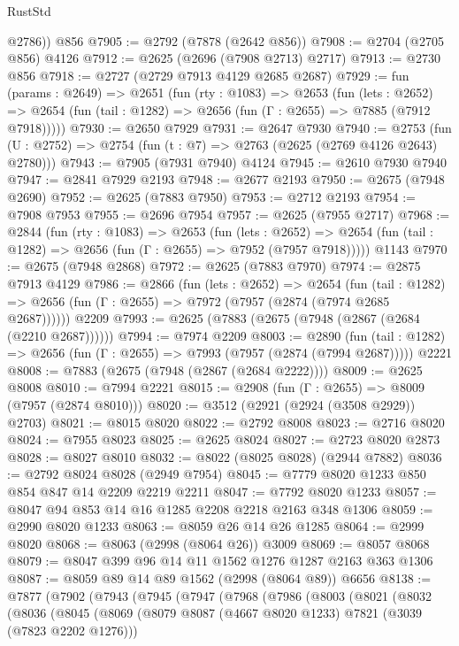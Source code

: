 \begin{lexlean}{RustStd}
\begin{coremodule}
        @2786))
    @856
@7905 := @2792 (@7878 (@2642 @856))
@7908 := @2704 (@2705 @856) @4126
@7912 := @2625 (@2696 (@7908 @2713) @2717)
@7913 := @2730 @856
@7918 := @2727 (@2729 @7913 @4129 @2685 @2687)
@7929 := fun (params : @2649) =>
  @2651
    (fun (rty : @1083) =>
    @2653
      (fun (lets : @2652) =>
      @2654 (fun (tail : @1282) => @2656 (fun (Γ : @2655) => @7885 (@7912 @7918)))))
@7930 := @2650 @7929
@7931 := @2647 @7930
@7940 := @2753 (fun (U : @2752) => @2754 (fun (t : @7) => @2763 (@2625 (@2769 @4126 @2643) @2780)))
@7943 := @7905 (@7931 @7940) @4124
@7945 := @2610 @7930 @7940
@7947 := @2841 @7929 @2193
@7948 := @2677 @2193
@7950 := @2675 (@7948 @2690)
@7952 := @2625 (@7883 @7950)
@7953 := @2712 @2193
@7954 := @7908 @7953
@7955 := @2696 @7954
@7957 := @2625 (@7955 @2717)
@7968 := @2844
    (fun (rty : @1083) =>
    @2653
      (fun (lets : @2652) =>
      @2654 (fun (tail : @1282) => @2656 (fun (Γ : @2655) => @7952 (@7957 @7918)))))
    @1143
@7970 := @2675 (@7948 @2868)
@7972 := @2625 (@7883 @7970)
@7974 := @2875 @7913 @4129
@7986 := @2866
    (fun (lets : @2652) =>
    @2654
      (fun (tail : @1282) => @2656 (fun (Γ : @2655) => @7972 (@7957 (@2874 (@7974 @2685 @2687))))))
    @2209
@7993 := @2625 (@7883 (@2675 (@7948 (@2867 (@2684 (@2210 @2687))))))
@7994 := @7974 @2209
@8003 := @2890
    (fun (tail : @1282) => @2656 (fun (Γ : @2655) => @7993 (@7957 (@2874 (@7994 @2687)))))
    @2221
@8008 := @7883 (@2675 (@7948 (@2867 (@2684 @2222))))
@8009 := @2625 @8008
@8010 := @7994 @2221
@8015 := @2908 (fun (Γ : @2655) => @8009 (@7957 (@2874 @8010)))
@8020 := @3512 (@2921 (@2924 (@3508 @2929)) @2703)
@8021 := @8015 @8020
@8022 := @2792 @8008
@8023 := @2716 @8020
@8024 := @7955 @8023
@8025 := @2625 @8024
@8027 := @2723 @8020 @2873
@8028 := @8027 @8010
@8032 := @8022 (@8025 @8028) (@2944 @7882)
@8036 := @2792 @8024 @8028 (@2949 @7954)
@8045 := @7779 @8020 @1233 @850 @854 @847 @14 @2209 @2219 @2211
@8047 := @7792 @8020 @1233
@8057 := @8047 @94 @853 @14 @16 @1285 @2208 @2218 @2163 @348 @1306
@8059 := @2990 @8020 @1233
@8063 := @8059 @26 @14 @26 @1285
@8064 := @2999 @8020
@8068 := @8063 (@2998 (@8064 @26)) @3009
@8069 := @8057 @8068
@8079 := @8047 @399 @96 @14 @11 @1562 @1276 @1287 @2163 @363 @1306
@8087 := @8059 @89 @14 @89 @1562 (@2998 (@8064 @89)) @6656
@8138 := @7877
    (@7902
      (@7943
        (@7945
          (@7947
            (@7968
              (@7986
                (@8003
                  (@8021
                    (@8032
                      (@8036
                        (@8045
                          (@8069
                            (@8079 @8087 (@4667 @8020 @1233) @7821 (@3039 (@7823 @2202 @1276)))

\end{coremodule}
\end{lexlean}
